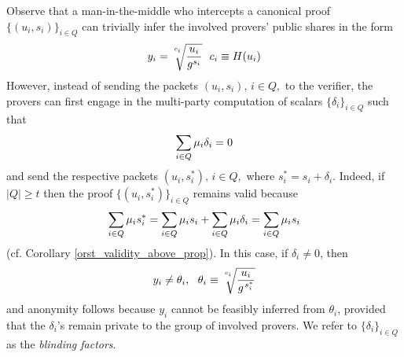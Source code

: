 \documentclass{iacrtrans}
\begin{document}
Observe that a man-in-the-middle who intercepts a canonical proof
$\{(u_i, s_i)\}_{i \in Q}$ can trivially
infer the involved provers' public shares in the form
\vspace{5pt}
\begin{equation}\label{orst_leaked_public}
y_i =
\sqrt[\leftroot{0}\uproot{10}c_i]{\frac{u_i}{g ^ {s_i}}}
\ \ c_i \equiv H(u_i)
\vspace{5pt}
\end{equation}
\noindent
However, instead of sending the packets
$(u_i, s_i),\hspace{2pt} i \in Q,$ to the verifier,
the provers can first engage in the multi-party computation
of scalars $\{\delta_i\}_{i \in Q}$ such that
\vspace{5pt}
\begin{equation}\label{orst_deviations}
\sum_{i \in Q} \mu_i \delta_i = 0
\vspace{5pt}
\end{equation}
and send the respective packets $(u_i, s_i^*),\hspace{2pt} i \in Q,$
where $s_i^* = s_i + \delta_i$.
Indeed, if $|Q| \ge t$
then the proof $\{(u_i, s_i^*)\}_{i \in Q}$ remains valid because
\vspace{5pt}
\begin{equation*}
\sum_{i \in Q} \mu_i s_i^* =
\sum_{i \in Q} \mu_i s_i + \sum_{i \in Q} \mu_i \delta_i = 
\sum_{i \in Q} \mu_i s_i
\vspace{5pt}
\end{equation*}
\noindent
(cf. Corollary \ref{orst_validity_above_prop}).
In this case, if $\delta_i \neq 0$, then
\vspace{5pt}
\begin{equation*}\label{orst_thetas}
y_i \neq \theta_i,
\ \ \theta_i \equiv
\sqrt[\leftroot{0}\uproot{10}c_i]{\frac{u_i}{g ^ {\hspace{1pt}s_i^*}}}
\vspace{5pt}
\end{equation*}
and anonymity follows because $y_i$
cannot be feasibly inferred from $\theta_i$,
provided that the $\delta_i$'s
remain private to the group of involved provers.
We refer to $\{\delta_i\}_{i \in Q}$
as the \textit{blinding factors}.
\end{document}
